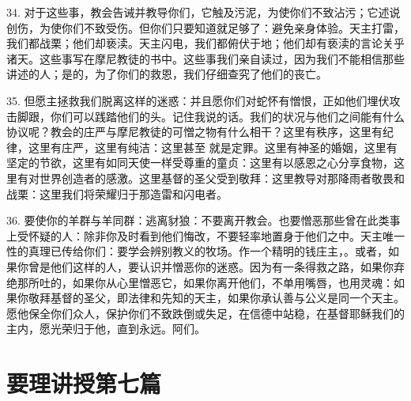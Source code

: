 34. 对于这些事，教会告诫并教导你们，它触及污泥，为使你们不致沾污；它述说创伤，为使你们不致受伤。但你们只要知道就足够了：避免亲身体验。天主打雷，我们都战栗；他们却亵渎。天主闪电，我们都俯伏于地；他们却有亵渎的言论关乎诸天。这些事写在摩尼教徒的书中。这些事我们亲自读过，因为我们不能相信那些讲述的人；是的，为了你们的救恩，我们仔细查究了他们的丧亡。\par

35. 但愿主拯救我们脱离这样的迷惑：并且愿你们对蛇怀有憎恨，正如他们埋伏攻击脚跟，你们可以践踏他们的头。记住我说的话。我们的状况与他们之间能有什么协议呢？教会的庄严与摩尼教徒的可憎之物有什么相干？这里有秩序，这里有纪律，这里有庄严，这里有纯洁：这里甚至 就是定罪。这里有神圣的婚姻，这里有坚定的节欲，这里有如同天使一样受尊重的童贞：这里有以感恩之心分享食物，这里有对世界创造者的感激。这里基督的圣父受到敬拜：这里教导对那降雨者敬畏和战栗：这里我们将荣耀归于那造雷和闪电者。\par

36. 要使你的羊群与羊同群：逃离豺狼：不要离开教会。也要憎恶那些曾在此类事上受怀疑的人：除非你及时看到他们悔改，不要轻率地置身于他们之中。天主唯一性的真理已传给你们：要学会辨别教义的牧场。作一个精明的钱庄主，。或者，如果你曾是他们这样的人，要认识并憎恶你的迷惑。因为有一条得救之路，如果你弃绝那所吐的，如果你从心里憎恶它，如果你离开他们，不单用嘴唇，也用灵魂：如果你敬拜基督的圣父，即法律和先知的天主，如果你承认善与公义是同一个天主。愿他保全你们众人，保护你们不致跌倒或失足，在信德中站稳，在基督耶稣我们的主内，愿光荣归于他，直到永远。阿们。\par



\section{要理讲授第七篇}

\par

\par

